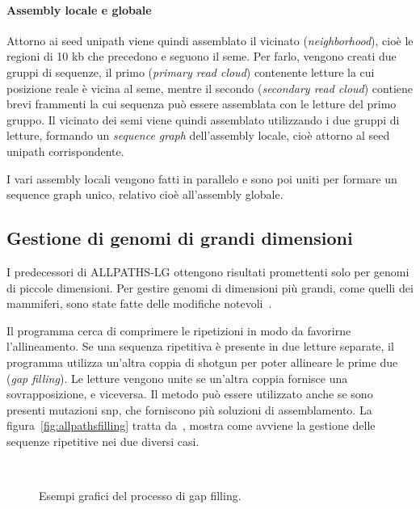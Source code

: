\documentclass[crop=false, class=book]{standalone}
\begin{document}
	\paragraph{Assembly locale e globale}
	Attorno ai seed unipath viene quindi assemblato il vicinato (\textit{neighborhood}), cioè le regioni di 10 kb che precedono e seguono il seme. Per farlo, vengono creati due gruppi di sequenze, il primo (\textit{primary read cloud}) contenente letture la cui posizione reale è vicina al seme, mentre il secondo (\textit{secondary read cloud}) contiene brevi frammenti la cui sequenza può essere assemblata con le letture del primo gruppo. Il vicinato dei semi viene quindi assemblato utilizzando i due gruppi di letture, formando un \textit{sequence graph} dell'assembly locale, cioè attorno al seed unipath corrispondente.
	
	I vari assembly locali vengono fatti in parallelo e sono poi uniti per formare un sequence graph unico, relativo cioè all'assembly globale.
	
	
	\subsection{Gestione di genomi di grandi dimensioni}
	I predecessori di ALLPATHS-LG ottengono risultati promettenti solo per genomi di piccole dimensioni. Per gestire genomi di dimensioni più grandi, come quelli dei mammiferi, sono state fatte delle modifiche notevoli~\cite{gnerre2011high}.

	Il programma cerca di comprimere le ripetizioni in modo da favorirne l'allineamento. Se una sequenza ripetitiva è presente in due letture separate, il programma utilizza un'altra coppia di shotgun per poter allineare le prime due (\textit{gap filling}). Le letture vengono unite se un'altra coppia fornisce una sovrapposizione, e viceversa. Il metodo può essere utilizzato anche se sono presenti mutazioni \gls{snp}, che forniscono più soluzioni di assemblamento. La figura~\vref{fig:allpathsfilling} tratta da~\cite{gnerre2011high}, mostra come avviene la gestione delle sequenze ripetitive nei due diversi casi.

	\begin{figure}
		\centering
		 \\
		\caption{Esempi grafici del processo di gap filling.}
		\label{fig:allpathsfilling}
	\end{figure}
	
\end{document}
